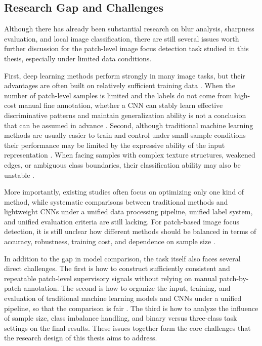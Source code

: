 \subsection{Research Gap and Challenges}

\par Although there has already been substantial research on blur analysis,
sharpness evaluation, and local image classification, there are still several
issues worth further discussion for the patch-level image focus detection task
studied in this thesis, especially under limited data conditions.

\par First, deep learning methods perform strongly in many image tasks, but
their advantages are often built on relatively sufficient training data
\cite{krizhevsky2012imagenet,shu2018small}. When the number of
patch-level samples is limited and the labels do not come from high-cost manual
fine annotation, whether a CNN can stably learn effective discriminative
patterns and maintain generalization ability is not a conclusion that can be
assumed in advance \cite{shu2018small,shorten2019survey}. Second, although
traditional machine learning methods are usually easier to train and control
under small-sample conditions their performance may be limited by the expressive
ability of the input representation \cite{cortes1995support,breiman2001random}.
When facing samples with complex texture structures, weakened edges, or
ambiguous class boundaries, their classification ability may also be unstable
\cite{pertuz2013analysis}.

\par More importantly, existing studies often focus on optimizing only one kind
of method, while systematic comparisons between traditional methods and
lightweight CNNs under a unified data processing pipeline, unified label system,
and unified evaluation criteria are still lacking. For patch-based image focus
detection, it is still unclear how different methods should be balanced in terms
of accuracy, robustness, training cost, and dependence on sample size
\cite{Hou_2016_CVPR}.

\par In addition to the gap in model comparison, the task itself also faces
several direct challenges. The first is how to construct sufficiently consistent
and repeatable patch-level supervisory signals without relying on manual
patch-by-patch annotation. The second is how to organize the input, training,
and evaluation of traditional machine learning models and CNNs under a unified
pipeline, so that the comparison is fair
\cite[pp.~321--423,~465--500]{murphy2022pml}. The third is how to analyze the
influence of sample size, class imbalance handling, and binary versus
three-class task settings on the final results. These issues together form the
core challenges that the research design of this thesis aims to address.

